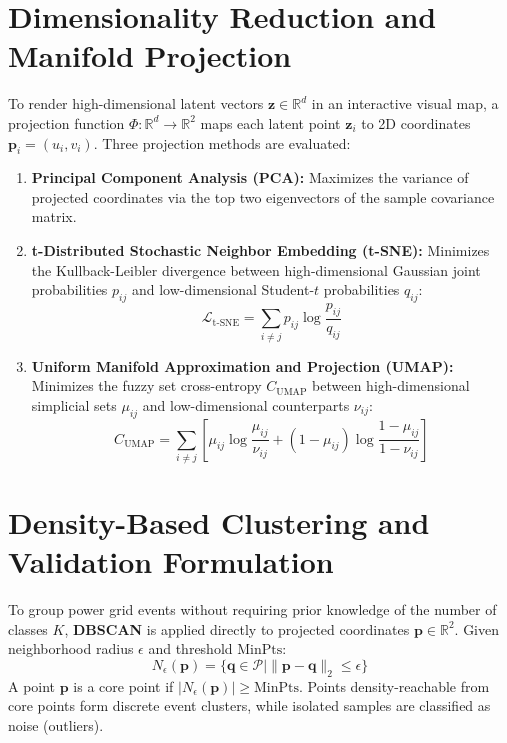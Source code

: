 \documentclass[12pt,a4paper]{report}
\begin{document}
\section{Dimensionality Reduction and Manifold Projection}
To render high-dimensional latent vectors $\mathbf{z} \in \mathbb{R}^d$ in an interactive visual map, a projection function $\Phi: \mathbb{R}^d \to \mathbb{R}^2$ maps each latent point $\mathbf{z}_i$ to 2D coordinates $\mathbf{p}_i = (u_i, v_i)$. Three projection methods are evaluated:
\begin{enumerate}
    \item \textbf{Principal Component Analysis (PCA):} Maximizes the variance of projected coordinates via the top two eigenvectors of the sample covariance matrix.
    \item \textbf{t-Distributed Stochastic Neighbor Embedding (t-SNE):} Minimizes the Kullback-Leibler divergence between high-dimensional Gaussian joint probabilities $p_{ij}$ and low-dimensional Student-$t$ probabilities $q_{ij}$:
    \begin{equation}
        \mathcal{L}_{\text{t-SNE}} = \sum_{i \neq j} p_{ij} \log \frac{p_{ij}}{q_{ij}}
    \end{equation}
    \item \textbf{Uniform Manifold Approximation and Projection (UMAP):} Minimizes the fuzzy set cross-entropy $C_{\text{UMAP}}$ between high-dimensional simplicial sets $\mu_{ij}$ and low-dimensional counterparts $\nu_{ij}$:
    \begin{equation}
        C_{\text{UMAP}} = \sum_{i \neq j} \left[ \mu_{ij} \log \frac{\mu_{ij}}{\nu_{ij}} + (1 - \mu_{ij}) \log \frac{1 - \mu_{ij}}{1 - \nu_{ij}} \right]
    \end{equation}
\end{enumerate}

\section{Density-Based Clustering and Validation Formulation}
To group power grid events without requiring prior knowledge of the number of classes $K$, \textbf{DBSCAN} is applied directly to projected coordinates $\mathbf{p} \in \mathbb{R}^2$. Given neighborhood radius $\epsilon$ and threshold $\text{MinPts}$:
\begin{equation}
    N_\epsilon(\mathbf{p}) = \{\mathbf{q} \in \mathcal{P} \mid \|\mathbf{p} - \mathbf{q}\|_2 \le \epsilon\}
\end{equation}
A point $\mathbf{p}$ is a core point if $|N_\epsilon(\mathbf{p})| \ge \text{MinPts}$. Points density-reachable from core points form discrete event clusters, while isolated samples are classified as noise (outliers).
\end{document}
